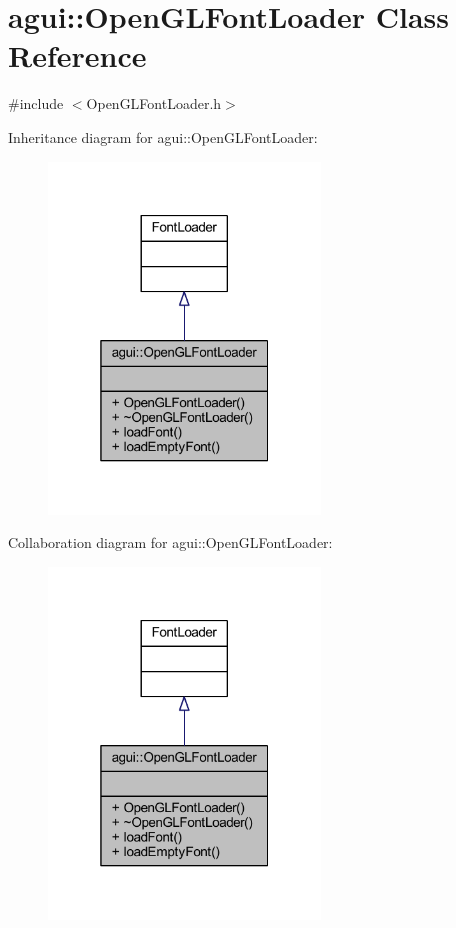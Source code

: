 \hypertarget{classagui_1_1_open_g_l_font_loader}{}\section{agui\+:\+:Open\+G\+L\+Font\+Loader Class Reference}
\label{classagui_1_1_open_g_l_font_loader}


{\ttfamily \#include $<$Open\+G\+L\+Font\+Loader.\+h$>$}



Inheritance diagram for agui\+:\+:Open\+G\+L\+Font\+Loader\+:\nopagebreak
\begin{figure}[H]
\begin{center}
\leavevmode
\includegraphics[width=205pt]{classagui_1_1_open_g_l_font_loader__inherit__graph}
\end{center}
\end{figure}


Collaboration diagram for agui\+:\+:Open\+G\+L\+Font\+Loader\+:\nopagebreak
\begin{figure}[H]
\begin{center}
\leavevmode
\includegraphics[width=205pt]{classagui_1_1_open_g_l_font_loader__coll__graph}
\end{center}
\end{figure}
